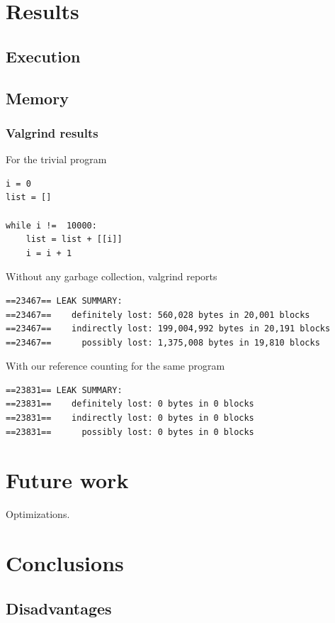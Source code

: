 \documentclass{sigplanconf}
\begin{document}
\section{Results}
\label{sec:results}

\subsection{Execution}

\subsection{Memory}

\subsubsection{Valgrind results}
For the trivial program
\begin{verbatim}
i = 0
list = []

while i !=  10000:
    list = list + [[i]]
    i = i + 1

\end{verbatim}
Without any garbage collection, valgrind reports 
\begin{verbatim}
==23467== LEAK SUMMARY:
==23467==    definitely lost: 560,028 bytes in 20,001 blocks
==23467==    indirectly lost: 199,004,992 bytes in 20,191 blocks
==23467==      possibly lost: 1,375,008 bytes in 19,810 blocks
\end{verbatim}
With our reference counting for the same program
\begin{verbatim}
==23831== LEAK SUMMARY:
==23831==    definitely lost: 0 bytes in 0 blocks
==23831==    indirectly lost: 0 bytes in 0 blocks
==23831==      possibly lost: 0 bytes in 0 blocks
\end{verbatim}

\section{Future work}
\label{sec:future}

Optimizations.

\section{Conclusions}
\label{sec:conclusion}

\subsection{Disadvantages}
\end{document}
